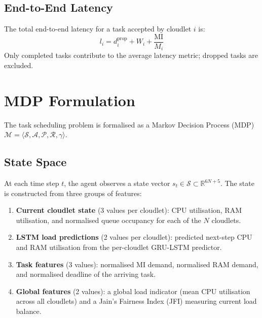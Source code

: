 \subsection{End-to-End Latency}

The total end-to-end latency for a task accepted by cloudlet $i$
is:
\begin{equation}
  l_i = d_i^{\text{prop}} + W_i + \frac{\text{MI}}{M_i}
  \label{eq:edge_latency}
\end{equation}
Only completed tasks contribute to the average latency metric;
dropped tasks are excluded.

\section{MDP Formulation}
\label{sec:mdp}

The task scheduling problem is formalised as a Markov Decision
Process (MDP) $\mathcal{M} = \langle \mathcal{S}, \mathcal{A},
\mathcal{P}, \mathcal{R}, \gamma \rangle$.

\subsection{State Space}

At each time step $t$, the agent observes a state vector
$s_t \in \mathcal{S} \subset \mathbb{R}^{6N+5}$. The state
is constructed from three groups of features:

\begin{enumerate}
  \item \textbf{Current cloudlet state} (3 values per cloudlet):
  CPU utilisation, RAM utilisation, and normalised queue occupancy
  for each of the $N$ cloudlets.

  \item \textbf{LSTM load predictions} (2 values per cloudlet):
  predicted next-step CPU and RAM utilisation from the per-cloudlet
  GRU-LSTM predictor.

  \item \textbf{Task features} (3 values): normalised MI demand,
  normalised RAM demand, and normalised deadline of the arriving
  task.

  \item \textbf{Global features} (2 values): a global load
  indicator (mean CPU utilisation across all cloudlets) and a
  Jain's Fairness Index (JFI) measuring current load balance.
\end{enumerate}

